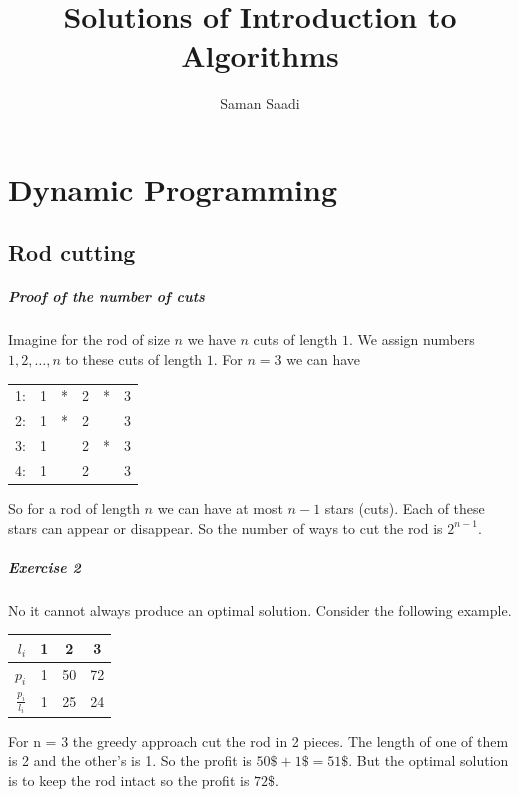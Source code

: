 \documentclass{book}
\title{Solutions of Introduction to Algorithms}
\author{Saman Saadi}
\date{}
\begin{document}
	\frontmatter
	\maketitle
	\tableofcontents
	\mainmatter
	\chapter{Dynamic Programming}
	\section{Rod cutting}
	\paragraph{Proof of the number of cuts}
	Imagine for the rod of size $n$ we have $n$ cuts of length $1$. We assign numbers $1, 2, \dots, n$ to these cuts of length $1$. For $n = 3$ we can have
	\begin{table}[H]
		\centering
		\begin{tabular}{r c c c c c}
			1: & 1 & * & 2 & * & 3 \\
			2: & 1 & * & 2 & & 3 \\
			3: & 1 &  & 2 & * & 3 \\
			4: & 1 & & 2 &  & 3 \\
		\end{tabular}
	\end{table}
	So for a rod of length $n$ we can have at most $n-1$ stars (cuts). Each of these stars can appear or disappear. So the number of ways to cut the rod is $2^{n - 1}$.
	\paragraph{Exercise 2}
	No it cannot always produce an optimal solution. Consider the following example.
	\begin{table}[H]
		\centering
		\begin{tabular}{r||c|c|c}			
			$l_i$ & 1 & 2 & 3\\
			\hline
			$p_i$ & 1 & 50 & 72 \\
			\hline
			$\frac{p_i}{l_i}$ & 1 & 25 & 24
		\end{tabular}
	\end{table}
	For n = 3 the greedy approach cut the rod in 2 pieces. The length of one of them is 2 and the other's is 1. So the profit is $50\$ + 1\$ = 51\$$. But the optimal solution is to keep the rod intact so the profit is $72\$$.
\end{document}
